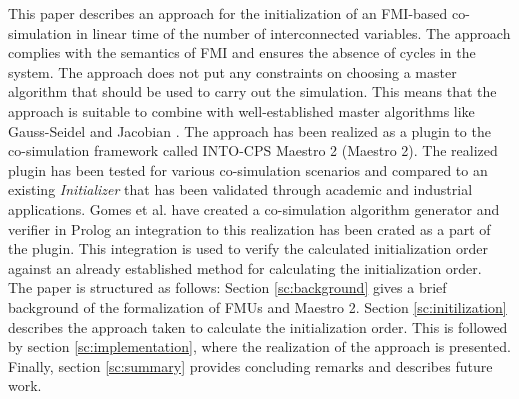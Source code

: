 This paper describes an approach for the initialization of an FMI-based co-simulation in linear time of the number of interconnected variables. The approach complies with the semantics of FMI and ensures the absence of cycles in the system. The approach does not put any constraints on choosing a master algorithm that should be used to carry out the simulation. This means that the approach is suitable to combine with well-established master algorithms like Gauss-Seidel and Jacobian \cite{Palensky2017}. The approach has been realized as a plugin to the co-simulation framework called INTO-CPS Maestro 2 (Maestro 2). The realized plugin has been tested for various co-simulation scenarios and compared to an existing \textit{Initializer} that has been validated through academic and industrial applications. Gomes et al. have created a co-simulation algorithm generator and verifier\cite{gomes_lucio_vangheluwe_2019} in Prolog an integration to this realization has been crated as a part of the plugin. This integration is used to verify the calculated initialization order against an already established method for calculating the initialization order.\\

The paper is structured as follows: Section \ref{sc:background} gives a brief background of the formalization of FMUs and Maestro 2. Section \ref{sc:initilization} describes the approach taken to calculate the initialization order. This is followed by section \ref{sc:implementation}, where the realization of the approach is presented. Finally, section \ref{sc:summary} provides concluding remarks and describes future work.